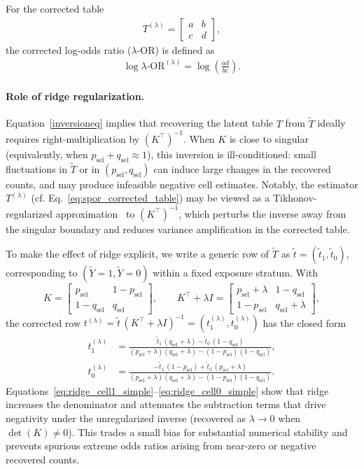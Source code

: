 \documentclass[pdflatex,sn-mathphys-num]{sn-jnl}%
\def\EQSP{3pt}
\newcommand{\cgather}[2][\EQSP]{\begingroup\setlength\abovedisplayskip{#1}\setlength\belowdisplayskip{#1}\begin{gather} #2 \end{gather}\endgroup\noindent}
\newcommand{\SPOR}{\textrm{$\lambda$-OR}}
\newcommand{\logor}{\log\SPOR}
\theoremstyle{thmstyleone}%
\theoremstyle{thmstyletwo}%
\theoremstyle{thmstylethree}%
\begin{document}
For the corrected table
\cgather{
T^{(\lambda)}=
\begin{bmatrix}
a & b\\
c & d
\end{bmatrix},
}
the corrected log-odds ratio ($\SPOR$) is defined as
\cgather{
\logor^{(\lambda)}
=
\log\!\left(\frac{ad}{bc}\right).}
%
\paragraph{Role of ridge regularization.}
Equation~\eqref{inversioneq} implies that recovering the latent table $T$ from $\tilde T$ ideally requires right-multiplication by $(K^\top)^{-1}$. When $K$ is close to singular (equivalently, when $p_{\mathrm{sel}}+q_{\mathrm{sel}}\approx 1$), this inversion is ill-conditioned: small fluctuations in $\tilde T$ or in $(p_{\mathrm{sel}},q_{\mathrm{sel}})$ can induce large changes in the recovered counts, and may produce infeasible negative cell estimates. Notably, the estimator $T^{(\lambda)}$ (cf. Eq.~\eqref{eq:spor_corrected_table}) may be viewed as a Tikhonov-regularized approximation~\cite{tikhonov1963regularization} to $(K^\top)^{-1}$, which perturbs the inverse away from the singular boundary and reduces variance amplification in the corrected table.

To make the effect of ridge explicit, we write a generic row of $\tilde T$ as $\tilde t=(\tilde t_1,\tilde t_0)$, corresponding to $(\tilde Y=1,\tilde Y=0)$ within a fixed exposure stratum. With
\[
K=\begin{bmatrix}
p_{\mathrm{sel}} & 1-p_{\mathrm{sel}}\\
1-q_{\mathrm{sel}} & q_{\mathrm{sel}}
\end{bmatrix},
\qquad
K^\top+\lambda I=
\begin{bmatrix}
p_{\mathrm{sel}}+\lambda & 1-q_{\mathrm{sel}}\\
1-p_{\mathrm{sel}} & q_{\mathrm{sel}}+\lambda
\end{bmatrix},
\]
the corrected row $t^{(\lambda)}=\tilde t\,(K^\top+\lambda I)^{-1}=(t^{(\lambda)}_1,t^{(\lambda)}_0)$ has the closed form
\begin{align}
t^{(\lambda)}_1
&=\frac{\tilde t_1\,(q_{\mathrm{sel}}+\lambda)-\tilde t_0\,(1-q_{\mathrm{sel}})}
{(p_{\mathrm{sel}}+\lambda)(q_{\mathrm{sel}}+\lambda)-(1-p_{\mathrm{sel}})(1-q_{\mathrm{sel}})},\label{eq:ridge_cell1_simple}\\
t^{(\lambda)}_0
&=\frac{-\tilde t_1\,(1-p_{\mathrm{sel}})+\tilde t_0\,(p_{\mathrm{sel}}+\lambda)}
{(p_{\mathrm{sel}}+\lambda)(q_{\mathrm{sel}}+\lambda)-(1-p_{\mathrm{sel}})(1-q_{\mathrm{sel}})}.\label{eq:ridge_cell0_simple}
\end{align}
Equations~\eqref{eq:ridge_cell1_simple}--\eqref{eq:ridge_cell0_simple} show that ridge increases the denominator and attenuates the subtraction terms that drive negativity under the unregularized inverse (recovered as $\lambda\to 0$ when $\det(K)\neq 0$).  This trades a small bias for substantial numerical stability and prevents spurious extreme odds ratios arising from near-zero or negative recovered counts.
\end{document}
